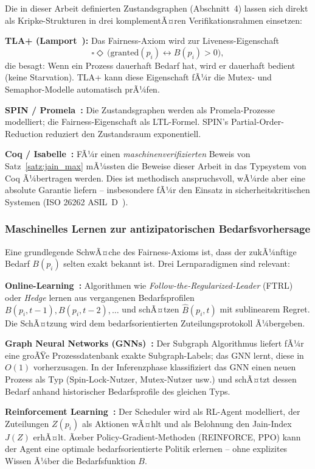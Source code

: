 ﻿\documentclass[a4paper,12pt]{article}
\theoremstyle{definition}
\begin{document}
Die in dieser Arbeit definierten Zustandsgraphen (Abschnitt~4)
lassen sich direkt als Kripke-Strukturen in drei komplementÃ¤ren
Verifikationsrahmen einsetzen:

\textbf{TLA+ (Lamport~\cite{lamport2002tla}):} Das Fairness-Axiom
wird zur Liveness-Eigenschaft
\[
  \square \Diamond\, \bigl(\mathrm{granted}(p_i)
  \leftrightarrow B(p_i) > 0\bigr),
\]
die besagt: Wenn ein Prozess dauerhaft Bedarf hat, wird er
dauerhaft bedient (keine Starvation). TLA+ kann diese
Eigenschaft fÃ¼r die Mutex- und Semaphor-Modelle automatisch
prÃ¼fen.

\textbf{SPIN / Promela~\cite{holzmann2004spin}:} Die
Zustandsgraphen werden als Promela-Prozesse modelliert;
die Fairness-Eigenschaft als LTL-Formel. SPIN's Partial-Order-Reduction
reduziert den Zustandsraum exponentiell.

\textbf{Coq / Isabelle~\cite{bertot2004coq}:} FÃ¼r einen
\emph{maschinenverifizierten} Beweis von Satz~\ref{satz:jain_max}
mÃ¼ssten die Beweise dieser Arbeit in das Typsystem von Coq
Ã¼bertragen werden. Dies ist methodisch anspruchsvoll, wÃ¼rde
aber eine absolute Garantie liefern -- insbesondere fÃ¼r den
Einsatz in sicherheitskritischen Systemen (ISO 26262
ASIL~D~\cite{iso26262}).

\subsubsection{Maschinelles Lernen zur antizipatorischen
Bedarfsvorhersage}

Eine grundlegende SchwÃ¤che des Fairness-Axioms ist, dass der
zukÃ¼nftige Bedarf $B(p_i)$ selten exakt bekannt ist.
Drei Lernparadigmen sind relevant:

\textbf{Online-Learning~\cite{cesa2006prediction}:}
Algorithmen wie \emph{Follow-the-Regularized-Leader} (FTRL)
oder \emph{Hedge} lernen aus vergangenen Bedarfsprofilen
$B(p_i, t-1), B(p_i, t-2), \ldots$ und schÃ¤tzen
$\hat{B}(p_i, t)$ mit sublinearem Regret. Die SchÃ¤tzung
wird dem bedarfsorientierten Zuteilungsprotokoll Ã¼bergeben.

\textbf{Graph Neural Networks (GNNs)~\cite{scarselli2009graph}:}
Der Subgraph Algorithmus liefert fÃ¼r eine groÃŸe Prozessdatenbank
exakte Subgraph-Labels; das GNN lernt, diese in $O(1)$
vorherzusagen. In der Inferenzphase klassifiziert das GNN
einen neuen Prozess als Typ (Spin-Lock-Nutzer,
Mutex-Nutzer usw.) und schÃ¤tzt dessen Bedarf anhand
historischer Bedarfsprofile des gleichen Typs.

\textbf{Reinforcement Learning~\cite{sutton2018reinforcement}:}
Der Scheduler wird als RL-Agent modelliert, der Zuteilungen
$Z(p_i)$ als Aktionen wÃ¤hlt und als Belohnung den
Jain-Index $J(Z)$ erhÃ¤lt. Ãœber Policy-Gradient-Methoden
(REINFORCE, PPO) kann der Agent eine optimale
bedarfsorientierte Politik erlernen -- ohne explizites
Wissen Ã¼ber die Bedarfsfunktion $B$.
\end{document}
